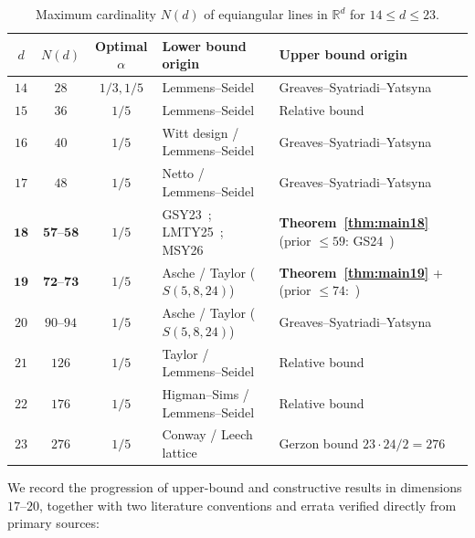 \documentclass[11pt,reqno]{amsart}
\theoremstyle{definition}
\theoremstyle{remark}
\numberwithin{equation}{section}
\numberwithin{table}{section}
\begin{document}
\begin{table}[htbp]
\centering
\caption{Maximum cardinality $N(d)$ of equiangular lines in $\mathbb{R}^d$ for $14 \le d \le 23$.}\label{tab:frontier_dims}
\footnotesize
\setlength{\tabcolsep}{4.5pt}
\begin{tabular}{@{}cccll@{}}
\toprule
$d$ & $N(d)$ & Optimal $\alpha$ & Lower bound origin & Upper bound origin \\
\midrule
$14$ & $28$ & $1/3, 1/5$ & Lemmens--Seidel~\cite{LemmensSeidel1973} & Greaves--Syatriadi--Yatsyna~\cite{GSY2021} \\
$15$ & $36$ & $1/5$ & Lemmens--Seidel~\cite{LemmensSeidel1973} & Relative bound~\cite{vanLintSeidel1966,LemmensSeidel1973} \\
$16$ & $40$ & $1/5$ & Witt design / Lemmens--Seidel~\cite{LemmensSeidel1973} & Greaves--Syatriadi--Yatsyna~\cite{GSY2021} \\
$17$ & $48$ & $1/5$ & Netto / Lemmens--Seidel~\cite{LemmensSeidel1973,GKMS2016} & Greaves--Syatriadi--Yatsyna~\cite{GSY2023} \\
$\mathbf{18}$ & $\mathbf{57\text{--}58}$ & $1/5$ & GSY23~\cite{GSY2023}; LMTY25~\cite{LMTY2025}; MSY26~\cite{MSY2026} & \textbf{Theorem~\ref{thm:main18}} (prior $\le 59$: GS24~\cite{GS2024}) \\
$\mathbf{19}$ & $\mathbf{72\text{--}73}$ & $1/5$ & Asche / Taylor ($S(5,8,24)$)~\cite{Taylor1977,LinYu2020} & \textbf{Theorem~\ref{thm:main19}} +~\cite{AzarijaMarc2018} (prior $\le 74$:~\cite{GSY2021}) \\
$20$ & $90\text{--}94$ & $1/5$ & Asche / Taylor ($S(5,8,24)$)~\cite{Taylor1977,LinYu2020} & Greaves--Syatriadi--Yatsyna~\cite{GSY2021} \\
$21$ & $126$ & $1/5$ & Taylor / Lemmens--Seidel~\cite{LemmensSeidel1973,Taylor1977} & Relative bound~\cite{LemmensSeidel1973} \\
$22$ & $176$ & $1/5$ & Higman--Sims / Lemmens--Seidel~\cite{LemmensSeidel1973} & Relative bound~\cite{LemmensSeidel1973} \\
$23$ & $276$ & $1/5$ & Conway / Leech lattice~\cite{LemmensSeidel1973} & Gerzon bound $23 \cdot 24 / 2 = 276$~\cite{LemmensSeidel1973} \\
\bottomrule
\end{tabular}
\end{table}

We record the progression of upper-bound and constructive results in dimensions $17$--$20$, together with two literature conventions and errata verified directly from primary sources:
\end{document}
